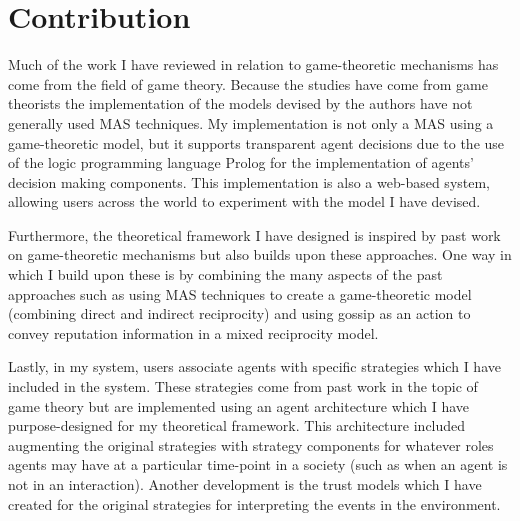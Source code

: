 \documentclass[]{final_report}
\begin{document}
\section{Contribution}
Much of the work I have reviewed in relation to game-theoretic mechanisms has come from the field of game theory. Because the studies have come from game theorists the implementation of the models devised by the authors have not generally used MAS techniques. My implementation is not only a MAS using a game-theoretic model, but it supports transparent agent decisions due to the use of the logic programming language Prolog for the implementation of agents' decision making components. This implementation is also a web-based system, allowing users across the world to experiment with the model I have devised.\par
Furthermore, the theoretical framework I have designed is inspired by past work on game-theoretic mechanisms but also builds upon these approaches. One way in which I build upon these is by combining the many aspects of the past approaches such as using MAS techniques to create a game-theoretic model (combining direct and indirect reciprocity) and using gossip as an action to convey reputation information in a mixed reciprocity model.\par
Lastly, in my system, users associate agents with specific strategies which I have included in the system. These strategies come from past work in the topic of game theory but are implemented using an agent architecture which I have purpose-designed for my theoretical framework. This architecture included augmenting the original strategies with strategy components for whatever roles agents may have at a particular time-point in a society (such as when an agent is not in an interaction). Another development is the trust models which I have created for the original strategies for interpreting the events in the environment.
\end{document}

